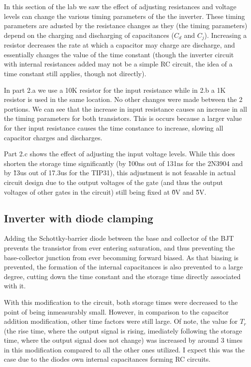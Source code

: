 \documentclass[10pt]{article}
\begin{document}
In this section of the lab we saw the effect of adjusting resistances and
voltage levels can change the various timing parameters of the the
inverter. These timing parameters are adusted by the resistance changes as
they (the timing parameters) depend on the charging and discharging of
capacitances ($C_d$ and $C_j$). Increasing a resistor decreases the rate
at which a capacitor may charge are discharge, and essentially changes the
value of the time constant (though the inverter circuit with internal
resistances added may not be a simple RC circuit, the idea of a time
constant still applies, though not directly). 

In part 2.a we use a 10K resistor for the input resistance while in 2.b a
1K resistor is used in the same location. No other changes were made
between the 2 portions. We can see that the increase in input resistance
causes an increase in all the timing parameters for both transistors. This
is occurs because a larger value for ther input resistance causes the time
constance to increase, slowing all capacitor charges and discharges.

Part 2.c shows the effect of adjusting the input voltage levels. While
this does shorten the storage time significantly (by \~100ns out of 131ns
for the 2N3904 and by \~13us out of 17.3us for the TIP31), this adjustment
is not feasable in actual circuit design due to the output voltages of the
gate (and thus the output voltages of other gates in the circuit) still
being fixed at \~0V and \~5V.

\subsection{Inverter with diode clamping}

Adding the Schottky-barrier diode between the base and collector of the
BJT prevents the transistor from ever entering saturation, and thus
preventing the base-collector junction from ever becomming forward biased.
As that biasing is prevented, the formation of the internal capacitances
is also prevented to a large degree, cutting down the time constant and
the storage time directly associated with it.

With this modification to the circuit, both storage times were decreased
to the point of being inmeasurably small. However, in comparison to the
capacitor addition modification, other time factors were still large. Of
note, the value for $T_r$ (the rise time, where the output signal is
rising, imediately following the storage time, where the output signal
does not change) was increased by around 3 times in this modification
compared to all the other ones utilized. I expect this was the case due to
the diodes own internal capacitances forming RC circuits.
\end{document}
